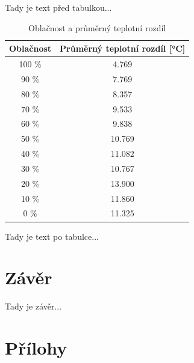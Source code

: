 \documentclass[12pt,a4paper]{report}															%
\begin{document}
Tady je text před tabulkou...

\begin{table}[h!]
	\centering
	\caption{Oblačnost a průměrný teplotní rozdíl}
	\label{tab:otr}
	\begin{tabular}{|c|c|}
		\hline
		\rowcolor{green!50}
		\textbf{Oblačnost} & \textbf{Průměrný teplotní rozdíl [°C]} \\
		\hline
		\rowcolor{yellow!40}
		100 \% & 4.769 \\
		\hline
		\rowcolor{yellow!40}
		90 \% & 7.769 \\
		\hline
		\rowcolor{yellow!40}
		80 \% & 8.357 \\
		\hline
		\rowcolor{yellow!40}
		70 \% & 9.533 \\
		\hline
		\rowcolor{yellow!40}
		60 \% & 9.838 \\
		\hline
		\rowcolor{yellow!40}
		50 \% & 10.769 \\
		\hline
		\rowcolor{yellow!40}
		40 \% & 11.082 \\
		\hline
		\rowcolor{yellow!40}
		30 \% & 10.767 \\
		\hline
		\rowcolor{yellow!40}
		20 \% & 13.900 \\
		\hline
		\rowcolor{yellow!40}
		10 \% & 11.860 \\
		\hline
		\rowcolor{yellow!40}
		0 \% & 11.325 \\
		\hline
	\end{tabular}
\end{table}

Tady je text po tabulce...

\chapter{Závěr}

Tady je závěr...

\nocite{*}																						%
\printbibliography[title={Použitá literatura},heading=bibnumbered]								%

\chapter{Přílohy}
\end{document}
